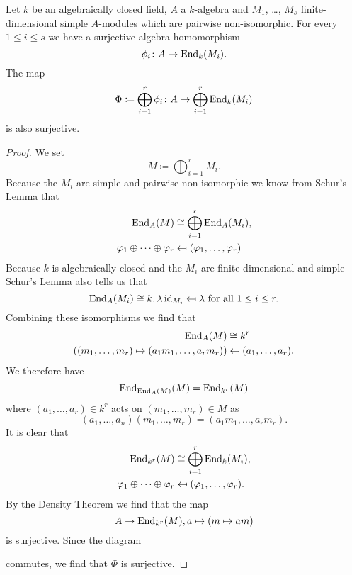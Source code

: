 \begin{lem}\label{lem: map into sum endomorphisms surjective}
 Let $k$ be an algebraically closed field, $A$ a $k$-algebra and $M_1$, \dots, $M_s$ finite-dimensional simple $A$-modules which are pairwise non-isomorphic. For every $1 \leq i \leq s$ we have a surjective algebra homomorphism
 \[
  \phi_i \colon A \to \operatorname{End}_k(M_i).
 \]
 The map
 \[
  \Phi \coloneqq \bigoplus_{i=1}^r \phi_i \colon A \to \bigoplus_{i=1}^r \operatorname{End}_k(M_i)
 \]
 is also surjective.
\end{lem}
\begin{proof}
 We set
 \[
  M \coloneqq \bigoplus_{i=1}^r M_i.
 \]
 Because the $M_i$ are simple and pairwise non-isomorphic we know from Schur’s Lemma that
 \begin{align*}
  \operatorname{End}_A(M) &\cong \bigoplus_{i=1}^r \operatorname{End}_A(M_i), \\
  \varphi_1 \oplus \dotsb \oplus \varphi_r &\mapsfrom (\varphi_1, \dotsc, \varphi_r)
 \end{align*}
 Because $k$ is algebraically closed and the $M_i$ are finite-dimensional and simple Schur’s Lemma also tells us that
 \[
  \operatorname{End}_A(M_i) \cong k, \lambda \operatorname{id}_{M_i} \mapsfrom \lambda \text{ for all } 1 \leq i \leq r.
 \]
 Combining these isomorphisms we find that
 \begin{align*}
  \operatorname{End}_A(M) &\cong k^r \\
  ((m_1, \dotsc, m_r) \mapsto (a_1 m_1, \dotsc, a_r m_r)) & \mapsfrom (a_1, \dotsc, a_r).
 \end{align*}
 We therefore have
 \[
  \operatorname{End}_{\operatorname{End}_A(M)}(M) = \operatorname{End}_{k^r}(M)
 \]
 where $(a_1, \dotsc, a_r) \in k^r$ acts on $(m_1, \dotsc, m_r) \in M$ as
 \[
  (a_1, \dotsc, a_n)(m_1, \dotsc, m_r) = (a_1 m_1, \dotsc, a_r m_r).
 \]
 It is clear that
 \begin{align*}
  \operatorname{End}_{k^r}(M) &\cong \bigoplus_{i=1}^r \operatorname{End}_k(M_i), \\
  \varphi_1 \oplus \dotsb \oplus \varphi_r &\mapsfrom (\varphi_1, \dotsc, \varphi_r).
 \end{align*}
 By the Density Theorem we find that the map
 \[
  A \to \operatorname{End}_{k^r}(M), a \mapsto (m \mapsto am)
 \]
 is surjective. Since the diagram
 \begin{center}
 \end{center}
 commutes, we find that $\Phi$ is surjective.
\end{proof}


